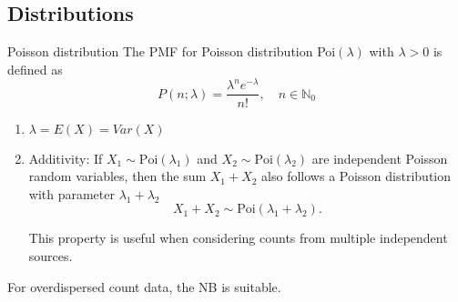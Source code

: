     
    

\subsection*{Distributions}
\begin{note}
    {Poisson distribution}\label{note:poisson-distribution}
    The \gls{PMF} for Poisson distribution Poi\((\lambda)\) with \(\lambda > 0\) is defined as
    \begin{equation}\label{eq:poisson-pmf}
        P(n;\lambda) = \frac{\lambda^n e^{-\lambda}}{n!}, \quad n \in \mathbb{N}_0
    \end{equation}
    \begin{enumerate}
        \item $\lambda = E(X) = Var(X)$ 
        \item Additivity: If $X_1 \sim \text{Poi}(\lambda_1)$ and $X_2 \sim \text{Poi}(\lambda_2)$ are independent Poisson random variables, then the sum $X_1 + X_2$ also follows a Poisson distribution with parameter $\lambda_1 + \lambda_2$
        \begin{equation}
            X_1 + X_2 \sim \text{Poi}(\lambda_1 + \lambda_2).
        \end{equation}
        
        This property is useful when considering counts from multiple independent sources.
    \end{enumerate}
\end{note}

For overdispersed count data, the \gls{NB} is suitable. 

